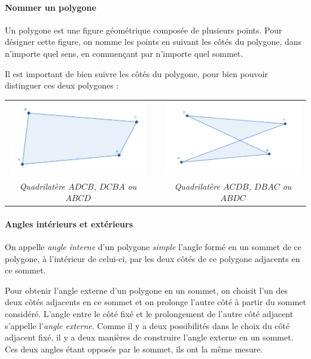 \documentclass[a4paper, twoside]{article}
\begin{document}
\paragraph*{Nommer un polygone}

Un polygone est une figure géométrique composée de plusieurs points.
Pour désigner cette figure, 
on nomme les points en suivant les côtés du polygone,
dans n'importe quel sens,
en commençant par n'importe quel sommet.

Il est important de bien suivre les côtés du polygone, 
pour bien pouvoir distinguer ces deux polygones :

\begin{center}
	\begin{tabular}{ccc}
		\includegraphics[width=6cm]{Image/Polygone ABCD.png} &               & \includegraphics[width=6cm]{Image/Polygone ABDC.png} \\
		\textit{Quadrilatère $ADCB$, $DCBA$ ou $ABCD$}       & \phantom{cou} & \textit{Quadrilatère $ACDB$, $DBAC$ ou $ABDC$}                         \\
	\end{tabular}
\end{center}

\paragraph*{Angles intérieurs et extérieurs}

On appelle \emph{angle interne} d'un polygone \textit{simple}
l'angle formé en un sommet de ce polygone,
à l'intérieur de celui-ci,
par les deux côtés de ce polygone adjacents en ce sommet.

Pour obtenir l'angle externe d'un polygone en un sommet,
on choisit l'un des deux côtés adjacents en ce sommet et
on prolonge l'autre côté à partir du sommet considéré.
L'angle entre le côté fixé et le prolongement de l'autre côté adjacent
s'appelle l'\emph{angle externe}.
Comme il y a deux possibilités dans le choix du côté adjacent fixé,
il y a deux manières de construire l'angle externe en un sommet.
Ces deux angles étant opposés par le sommet, ils ont la même mesure.
\end{document}
